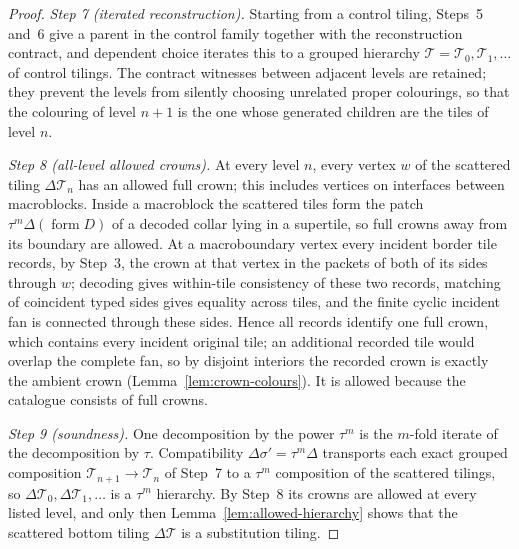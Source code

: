\begin{proof}
\emph{Step 7 (iterated reconstruction).}  Starting from a control tiling,
Steps~5 and~6 give a parent in the control family together with the
reconstruction contract, and dependent choice iterates this to a grouped
hierarchy $\mathcal T=\mathcal T_0,\mathcal T_1,\ldots$ of control tilings.
The contract witnesses between adjacent levels are retained; they prevent
the levels from silently choosing unrelated proper colourings, so that the
colouring of level $n+1$ is the one whose generated children are the tiles
of level $n$.

\emph{Step 8 (all-level allowed crowns).}  At every level $n$, every vertex
$w$ of the scattered tiling $\Delta\mathcal T_n$ has an allowed full crown;
this includes vertices on interfaces between macroblocks.  Inside a
macroblock the scattered tiles form the patch $\tau^m\Delta(\operatorname
{form}D)$ of a decoded collar lying in a supertile, so full crowns away
from its boundary are allowed.  At a macroboundary vertex every incident
border tile records, by Step~3, the crown at that vertex in the packets of
both of its sides through $w$; decoding gives within-tile consistency of
these two records, matching of coincident typed sides gives equality across
tiles, and the finite cyclic incident fan is connected through these
sides.  Hence all records identify one full crown, which contains every
incident original tile; an additional recorded tile would overlap the
complete fan, so by disjoint interiors the recorded crown is exactly the
ambient crown (Lemma~\ref{lem:crown-colours}).  It is allowed because the
catalogue consists of full crowns.

\emph{Step 9 (soundness).}  One decomposition by the power $\tau^m$ is the
$m$-fold iterate of the decomposition by $\tau$.  Compatibility
$\Delta\sigma'=\tau^m\Delta$ transports each exact grouped composition
$\mathcal T_{n+1}\to\mathcal T_n$ of Step~7 to a $\tau^m$ composition of the
scattered tilings, so $\Delta\mathcal T_0,\Delta\mathcal T_1,\ldots$ is a
$\tau^m$ hierarchy.  By Step~8 its crowns are allowed at every listed level,
and only then Lemma~\ref{lem:allowed-hierarchy} shows that the scattered
bottom tiling $\Delta\mathcal T$ is a substitution tiling.


\end{proof}

